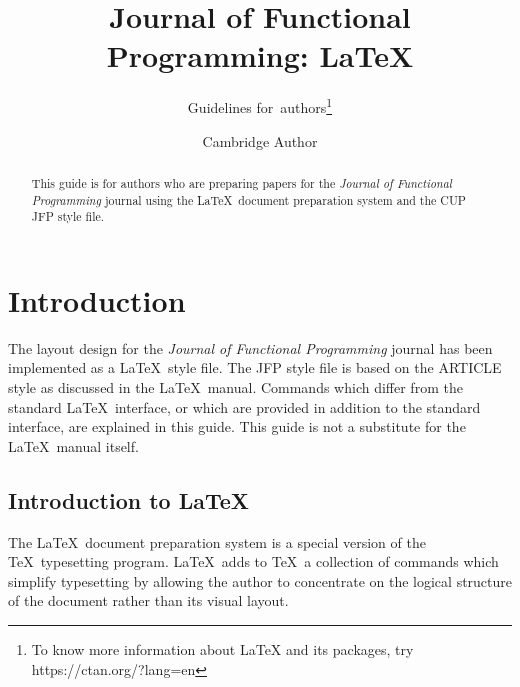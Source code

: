 \documentclass{jfp}
\begin{document}


\totalpg{\pageref{lastpage01}}

\title{Journal of Functional Programming: \LaTeX}
\subtitle{Guidelines for~authors\footnote{To know more information about LaTeX and its packages, try https://ctan.org/?lang=en}}

\begin{authgrp}
\author{Cambridge Author}
\end{authgrp}


\begin{abstract}
This guide is for authors who are preparing papers for the {\em Journal of Functional Programming} journal using the \LaTeX\ document preparation
system and the CUP JFP style file.
\end{abstract}

\maketitle

\section{Introduction}

The layout design for the {\em Journal of Functional Programming} journal
has been implemented as a LaTeX\ style file. The JFP style file is based
on the ARTICLE style as discussed in the LaTeX\ manual. Commands which
differ from the standard LaTeX\ interface, or which are provided in addition
to the standard interface, are explained in this guide. This guide is not a
substitute for the LaTeX\ manual itself.

\subsection{Introduction to LaTeX}

The LaTeX\ document preparation system is a special version of the
TeX\ typesetting program. LaTeX\ adds to TeX\ a collection of
commands which simplify typesetting by allowing the author to
concentrate on the logical structure of the document rather than
its visual layout.
\end{document}
